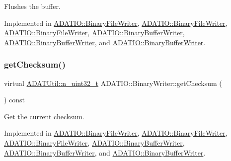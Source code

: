 Flushes the buffer. 



Implemented in \mbox{\hyperlink{classADATIO_1_1BinaryFileWriter_ad914b901c6386a2ad7b2c8cf9bddfa9b}{A\+D\+A\+T\+I\+O\+::\+Binary\+File\+Writer}}, \mbox{\hyperlink{classADATIO_1_1BinaryFileWriter_ad914b901c6386a2ad7b2c8cf9bddfa9b}{A\+D\+A\+T\+I\+O\+::\+Binary\+File\+Writer}}, \mbox{\hyperlink{classADATIO_1_1BinaryFileWriter_ad914b901c6386a2ad7b2c8cf9bddfa9b}{A\+D\+A\+T\+I\+O\+::\+Binary\+File\+Writer}}, \mbox{\hyperlink{classADATIO_1_1BinaryBufferWriter_accc3319508a804b054d21b6bddeef85d}{A\+D\+A\+T\+I\+O\+::\+Binary\+Buffer\+Writer}}, \mbox{\hyperlink{classADATIO_1_1BinaryBufferWriter_accc3319508a804b054d21b6bddeef85d}{A\+D\+A\+T\+I\+O\+::\+Binary\+Buffer\+Writer}}, and \mbox{\hyperlink{classADATIO_1_1BinaryBufferWriter_accc3319508a804b054d21b6bddeef85d}{A\+D\+A\+T\+I\+O\+::\+Binary\+Buffer\+Writer}}.

\mbox{\label{classADATIO_1_1BinaryWriter_a8bebb70a7248b14c8a4dcf7aa49c1503}} 
\subsubsection{\texorpdfstring{getChecksum()}{getChecksum()}\hspace{0.1cm}{\footnotesize\ttfamily [1/3]}}
{\footnotesize\ttfamily virtual \mbox{\hyperlink{namespaceADATUtil_ad945a8afa4db2d1f89b731964adae97e}{A\+D\+A\+T\+Util\+::n\+\_\+uint32\+\_\+t}} A\+D\+A\+T\+I\+O\+::\+Binary\+Writer\+::get\+Checksum (\begin{DoxyParamCaption}{ }\end{DoxyParamCaption}) const\hspace{0.3cm}{\ttfamily [pure virtual]}}



Get the current checksum. 



Implemented in \mbox{\hyperlink{classADATIO_1_1BinaryFileWriter_ad6f9d995a02d4b3e8e12ad18972d58a5}{A\+D\+A\+T\+I\+O\+::\+Binary\+File\+Writer}}, \mbox{\hyperlink{classADATIO_1_1BinaryFileWriter_ad6f9d995a02d4b3e8e12ad18972d58a5}{A\+D\+A\+T\+I\+O\+::\+Binary\+File\+Writer}}, \mbox{\hyperlink{classADATIO_1_1BinaryFileWriter_ad6f9d995a02d4b3e8e12ad18972d58a5}{A\+D\+A\+T\+I\+O\+::\+Binary\+File\+Writer}}, \mbox{\hyperlink{classADATIO_1_1BinaryBufferWriter_a3d7ec1583f03981f0a84571646be46f3}{A\+D\+A\+T\+I\+O\+::\+Binary\+Buffer\+Writer}}, \mbox{\hyperlink{classADATIO_1_1BinaryBufferWriter_a3d7ec1583f03981f0a84571646be46f3}{A\+D\+A\+T\+I\+O\+::\+Binary\+Buffer\+Writer}}, and \mbox{\hyperlink{classADATIO_1_1BinaryBufferWriter_a3d7ec1583f03981f0a84571646be46f3}{A\+D\+A\+T\+I\+O\+::\+Binary\+Buffer\+Writer}}.

